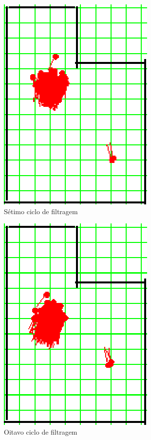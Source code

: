 \begin{figure}[H]
  \centering
  \includegraphics[scale=1]{figuras/cen1_ex2/8.eps}
  \caption[Sétimo Ciclo de Filtragem]{Sétimo ciclo de filtragem}
  \label{img:cen1_ex2_8}
\end{figure}

\begin{figure}[H]
  \centering
  \includegraphics[scale=1]{figuras/cen1_ex2/9.eps}
  \caption[Oitavo Ciclo de Filtragem]{Oitavo ciclo de filtragem}
  \label{img:cen1_ex2_9}
\end{figure}

